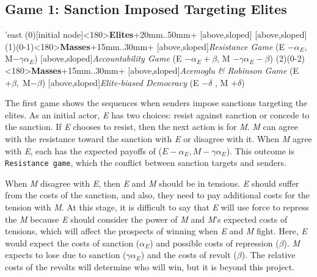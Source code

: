 \documentclass[11pt]{article}
\begin{document}
	\subsection*{Game 1: Sanction Imposed Targeting Elites}
	
	\begin{istgame}[font=\footnotesize]
		\centering
		\setistgrowdirection'{east}
		\xtShowArrows
		\istroot(0)[initial node]<180>{\textbf{Elites}}+20mm..50mm+
		[above,sloped]  [above,sloped] \endist
		\istroot(1)(0-1)<180>{\textbf{Masses}}+15mm..30mm+
		[above,sloped]{\textit{Resistance Game} (E $- \alpha_{E}$, M$-\gamma$$\alpha_{E}$) }
		[above,sloped]{\textit{Accountability Game} (E $- \alpha_{E} + \beta$, M $- \gamma\alpha_{E} - \beta$)}  \endist
		\istroot(2)(0-2)<180>{\textbf{Masses}}+15mm..30mm+
		[above,sloped]{\textit{Acemoglu \& Robinson Game} (E $+ \beta,\; $M$-\beta$)}
		[above,sloped]{\textit{Elite-biased Democracy} (E $-\delta$ , M $+ \delta$)} \endist
	\end{istgame}
	
	
	The first game shows the sequences when senders impose sanctions targeting the elites. As an initial actor, \textit{E} has two choices: resist against sanction or concede to the sanction. If \textit{E} chooses to resist, then the next action is for \textit{M}. \textit{M} can agree with the resistance toward the sanction with \textit{E} or disagree with it. When \textit{M} agree with \textit{E}, each has the expected payoffs of ($E-\alpha_E, M-\gamma\alpha_{E}$). This outcome is \texttt{Resistance game}, which the conflict between sanction targets and senders.
	
	When \textit{M} disagree with \textit{E}, then \textit{E} and \textit{M} should be in tensions. \textit{E} should suffer from the costs of the sanction, and also, they need to pay additional costs for the tension with \textit{M}. At this stage, it is difficult to say that \textit{E} will use force to repress the \textit{M} because \textit{E} should consider the power of \textit{M} and \textit{M}'s expected costs of tensions, which will affect the prospects of winning when \textit{E} and \textit{M} fight. Here, \textit{E} would expect the costs of sanction ($\alpha_{E}$) and possible costs of repression ($\beta$). \textit{M} expects to lose due to sanction ($\gamma\alpha_{E}$) and the costs of revolt ($\beta$). The relative costs of the revolts will determine who will win, but it is beyond this project.
	
\end{document}

